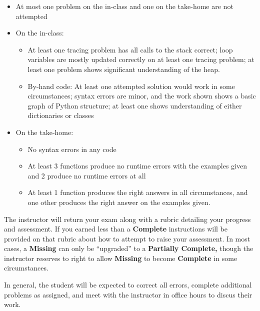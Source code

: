\documentclass{article}
\newcommand{\vs}{\vspace{0.1in}}
\begin{document}
\begin{itemize}
\item	At most one problem on the in-class and one on the take-home are not attempted
\item	On the in-class:
\begin{itemize}
\item  At least one tracing problem has all calls to the stack correct; loop variables are mostly updated correctly on at least one tracing problem; at least one problem shows significant understanding of the heap.
\item  By-hand code: At least one attempted solution would work in some circumstances; syntax errors are minor, and the work shown shows a basic graph of Python structure; at least one shows understanding of either dictionaries or classes
\end{itemize}
\item	On the take-home:
\begin{itemize}
\item	No syntax errors in any code
\item	At least 3 functions produce no runtime errors with the examples given and 2 produce no runtime errors at all
\item	At least 1 function produces the right answers in all circumstances, and one other produces the right answer on the examples given.
\end{itemize}
\end{itemize}

The instructor will return your exam along with a rubric detailing your progress and assessment. If you earned less than a \textbf{Complete} instructions will be provided on that rubric about how to attempt to raise your assessment. In most cases, a \textbf{Missing} can only be ``upgraded'' to a \textbf{Partially Complete,} though the instructor reserves to right to allow \textbf{Missing} to become \textbf{Complete} in some circumstances.

\vs

In general, the student will be expected to correct all errors, complete additional problems as assigned, and meet with the instructor in office hours to discus their work.


\newpage
\end{document}
